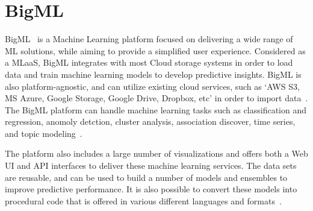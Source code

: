 \section{BigML}

BigML~\cite{hid-sp18-504-cloudacad-bigml} is a Machine Learning platform
focused on delivering a wide range of ML solutions, while aiming to provide
a simplified user experience. Considered as a MLaaS, BigML integrates with
most Cloud storage systems in order to load data and train machine learning
models to develop predictive insights. BigML is also platform-agnostic,
and can utilize existing cloud services, such as `AWS S3, MS Azure, Google Storage,
Google Drive, Dropbox, etc' in order to import data~\cite{hid-sp18-504-cloudacad-bigml}. 
The BigML platform can handle machine learning tasks such as classification
and regression, anomoly detction, cluster analysis, association discover, time series,
and topic modeling~\cite{hid-sp18-504-bigml}.

The platform also includes a large number of visualizations and offers both a Web UI
and API interfaces to deliver these machine learning services. The data sets are
reusable, and can be used to build a number of models and ensembles to improve
predictive performance. It is also possible to convert these models into procedural code
that is offered in various different languages and formats~\cite{hid-sp18-504-cloudacad-bigml}.
